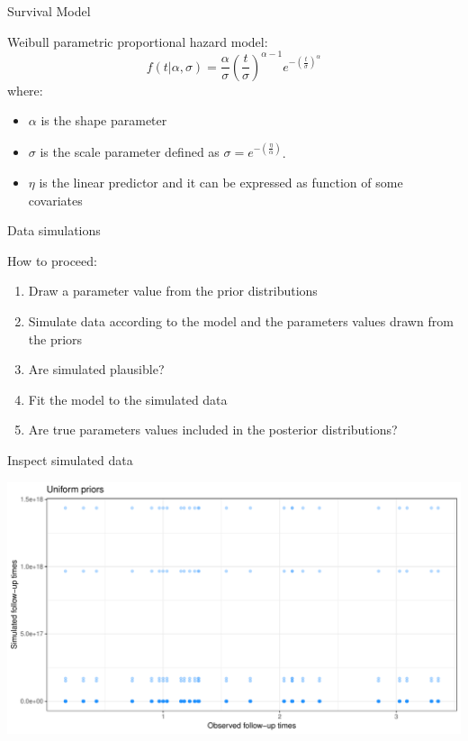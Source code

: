 \documentclass[ignorenonframetext,a4paper]{beamer}
\begin{document}
\begin{frame}{Survival Model}

Weibull parametric proportional hazard model: \[
  f \left( t \vert \alpha, \sigma \right) = \frac{\alpha}{\sigma} \left( \frac{t}{\sigma}\right)^{\alpha - 1} e ^{ - \left( \frac{t}{\sigma} \right)^{\alpha} }
  \] where:

\begin{itemize}
 \item{$\alpha$ is the shape parameter}
 \item{$\sigma$ is the scale parameter defined as $\sigma = e ^{ - \left( \frac{\eta}{\alpha} \right) }$}.
 \item{$\eta$ is the linear predictor and it can be expressed as 
       function of some covariates}
\end{itemize}

\end{frame}

\begin{frame}{Data simulations}

How to proceed:

\begin{enumerate}
  \item{Draw a parameter value from the prior distributions}
  \item{Simulate data according to the model and the parameters 
        values drawn from the priors}
  \item{Are simulated plausible?}
  \item{Fit the model to the simulated data}
  \item{Are true parameters values included in the posterior 
        distributions?}
\end{enumerate}

\end{frame}

\begin{frame}{Inspect simulated data}

\includegraphics{DB_presentation_case_study_files/figure-beamer/unnamed-chunk-6-1.pdf}

\end{frame}
\end{document}
